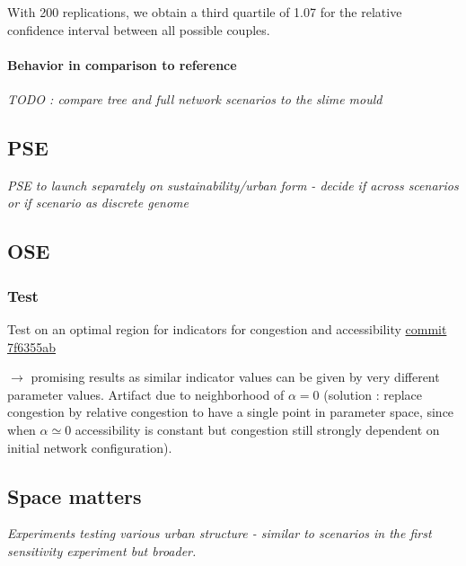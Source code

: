 With 200 replications, we obtain a third quartile of 1.07 for the relative confidence interval between all possible couples.






\paragraph{Behavior in comparison to reference}

\textit{TODO : compare tree and full network scenarios to the slime mould}




\subsection{PSE}

\textit{PSE to launch separately on sustainability/urban form - decide if across scenarios or if scenario as discrete genome}


\subsection{OSE}


\subsubsection{Test}

Test on an optimal region for indicators for congestion and accessibility \href{https://github.com/JusteRaimbault/Governance/commit/7f6355aba398948242e7b3f9984c20c3137900c9}{commit 7f6355ab}

$\rightarrow$ promising results as similar indicator values can be given by very different parameter values. Artifact due to neighborhood of $\alpha = 0$ (solution : replace congestion by relative congestion to have a single point in parameter space, since when $\alpha \simeq 0$ accessibility is constant but congestion still strongly dependent on initial network configuration).



\subsection{Space matters}

\textit{Experiments testing various urban structure - similar to scenarios in the first sensitivity experiment but broader.}










